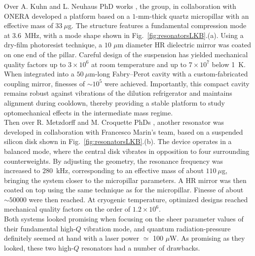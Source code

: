 Over A. Kuhn and L. Neuhaus PhD works \cite{kuhn,neuhaus}, the group, in collaboration with ONERA developed a platform based on a $1$-mm-thick quartz micropillar with an effective mass of $33~\mu$g. The structure features a fundamental compression mode at $3.6$~MHz, with a mode shape shown in Fig.~\ref{fig:resonatorsLKB}.(a). Using a dry-film photoresist technique, a $10$ $\mu$m diameter HR dielectric mirror was coated on one end of the pillar. Careful design of the suspension has yielded mechanical quality factors up to $3\times 10^{6}$ at room temperature and up to $7\times 10^{7}$ below 1~K. When integrated into a $50~\mu$m-long Fabry--Perot cavity with a custom-fabricated coupling mirror, finesses of $\sim10^{5}$ were achieved. Importantly, this compact cavity remains robust against vibrations of the dilution refrigerator and maintains alignment during cooldown, thereby providing a stable platform to study optomechanical effects in the intermediate mass regime. \\

Then over R. Metzdorff and M. Croquette PhDs \cite{metzdorff,croquette}, another resonator was developed in collaboration with Francesco Marin’s team, based on a suspended silicon disk shown in Fig.~\ref{fig:resonatorsLKB}.(b). The device operates in a balanced mode, where the central disk vibrates in opposition to four surrounding counterweights. By adjusting the geometry, the resonance frequency was increased to $280$~kHz, corresponding to an effective mass of about $110~\mu$g, bringing the system closer to the micropillar parameters. A HR mirror was then coated on top using the same technique as for the micropillar. Finesse of about $\sim 50 000$ were then reached. At cryogenic temperature, optimized designs reached mechanical quality factors on the order of $1.2 \times 10^{6}$. \\

Both systems looked promising when focusing on the sheer parameter values of their fundamental high-$Q$ vibration mode, and quantum radiation-pressure definitely seemed at hand with a laser power $\simeq$ 100 $\mu$W. As promising as they looked, these two high-$Q$ resonators had a number of drawbacks. \\

